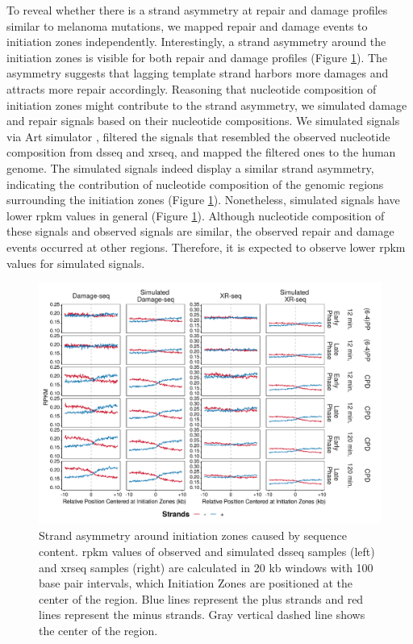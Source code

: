 To reveal whether there is a strand asymmetry at repair and damage profiles similar to melanoma mutations, we mapped repair and damage events to initiation zones independently. Interestingly, a strand asymmetry around the initiation zones is visible for both repair and damage profiles (Figure \ref{fig:simulation}). The asymmetry suggests that lagging template strand harbors more damages and attracts more repair accordingly. Reasoning that nucleotide composition of initiation zones might contribute to the strand asymmetry, we simulated damage and repair signals based on their nucleotide compositions. We simulated signals via Art simulator \citep{huang2012art}, filtered the signals that resembled the observed nucleotide composition from \gls{dsseq} and \gls{xrseq}, and mapped the filtered ones to the human genome. The simulated signals indeed display a similar strand asymmetry, indicating the contribution of nucleotide composition of the genomic regions surrounding the initiation zones (Figure \ref{fig:simulation}). Nonetheless, simulated signals have lower \gls{rpkm} values in general (Figure \ref{fig:simulation}). Although nucleotide composition of these signals and observed signals are similar, the observed repair and damage events occurred at other regions. Therefore, it is expected to observe lower \gls{rpkm} values for simulated signals. 

\begin{figure}[H]
    \begin{center}
    \includegraphics[width=\textwidth]{Chapters/4_results/figures/fig5}
    \caption[Strand asymmetry around initiation zones caused by sequence content.]{Strand asymmetry around initiation zones caused by sequence content. \gls{rpkm} values of observed and simulated \gls{dsseq} samples (left) and \gls{xrseq} samples (right) are calculated in 20 \gls{kb} windows with 100 base pair intervals, which Initiation Zones are positioned at the center of the region. Blue lines represent the plus strands and red lines represent the minus strands. Gray vertical dashed line shows the center of the region.}
    \label{fig:simulation}
    \end{center}
    \end{figure}

